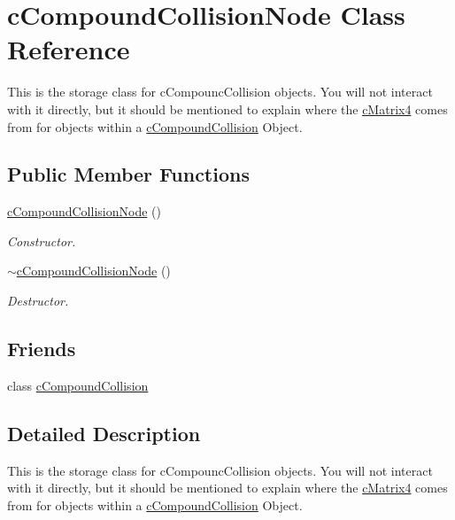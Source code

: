 \hypertarget{classc_compound_collision_node}{
\section{cCompoundCollisionNode Class Reference}
\label{classc_compound_collision_node}
}


This is the storage class for cCompouncCollision objects. You will not interact with it directly, but it should be mentioned to explain where the \hyperlink{classc_matrix4}{cMatrix4} comes from for objects within a \hyperlink{classc_compound_collision}{cCompoundCollision} Object.  


\subsection*{Public Member Functions}
\begin{DoxyCompactItemize}
\item 
\hypertarget{classc_compound_collision_node_ab3c55081c67d9cac8ea79f8b524ec696}{
\hyperlink{classc_compound_collision_node_ab3c55081c67d9cac8ea79f8b524ec696}{cCompoundCollisionNode} ()}
\label{classc_compound_collision_node_ab3c55081c67d9cac8ea79f8b524ec696}

\begin{DoxyCompactList}\small\item\em Constructor. \end{DoxyCompactList}\item 
\hypertarget{classc_compound_collision_node_acf2c370d49bf0f1b4be04c04348f4b4e}{
\hyperlink{classc_compound_collision_node_acf2c370d49bf0f1b4be04c04348f4b4e}{$\sim$cCompoundCollisionNode} ()}
\label{classc_compound_collision_node_acf2c370d49bf0f1b4be04c04348f4b4e}

\begin{DoxyCompactList}\small\item\em Destructor. \end{DoxyCompactList}\end{DoxyCompactItemize}
\subsection*{Friends}
\begin{DoxyCompactItemize}
\item 
\hypertarget{classc_compound_collision_node_adac1704bd2ebfcd3d16228685997db63}{
class \hyperlink{classc_compound_collision_node_adac1704bd2ebfcd3d16228685997db63}{cCompoundCollision}}
\label{classc_compound_collision_node_adac1704bd2ebfcd3d16228685997db63}

\end{DoxyCompactItemize}


\subsection{Detailed Description}
This is the storage class for cCompouncCollision objects. You will not interact with it directly, but it should be mentioned to explain where the \hyperlink{classc_matrix4}{cMatrix4} comes from for objects within a \hyperlink{classc_compound_collision}{cCompoundCollision} Object. 